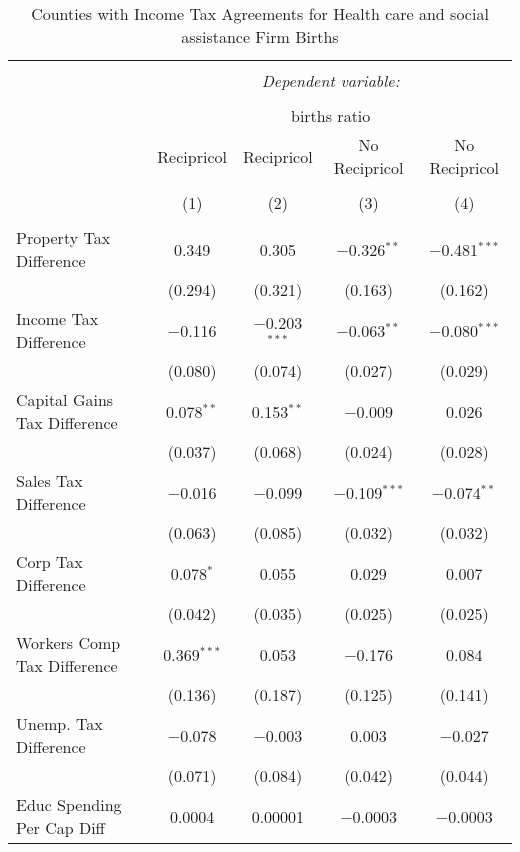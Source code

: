 
\begin{table}[!htbp] \centering 
  \caption{Counties with Income Tax Agreements for  Health care and social assistance Firm Births} 
  \label{62rd} 
\begin{tabular}{@{\extracolsep{5pt}}lcccc} 
\\[-1.8ex]\hline 
\hline \\[-1.8ex] 
 & \multicolumn{4}{c}{\textit{Dependent variable:}} \\ 
\cline{2-5} 
\\[-1.8ex] & \multicolumn{4}{c}{births ratio} \\ 
 & Recipricol & Recipricol & No Recipricol & No Recipricol \\ 
\\[-1.8ex] & (1) & (2) & (3) & (4)\\ 
\hline \\[-1.8ex] 
 Property Tax Difference & 0.349 & 0.305 & $-$0.326$^{**}$ & $-$0.481$^{***}$ \\ 
  & (0.294) & (0.321) & (0.163) & (0.162) \\ 
  Income Tax Difference & $-$0.116 & $-$0.203$^{***}$ & $-$0.063$^{**}$ & $-$0.080$^{***}$ \\ 
  & (0.080) & (0.074) & (0.027) & (0.029) \\ 
  Capital Gains Tax Difference & 0.078$^{**}$ & 0.153$^{**}$ & $-$0.009 & 0.026 \\ 
  & (0.037) & (0.068) & (0.024) & (0.028) \\ 
  Sales Tax Difference & $-$0.016 & $-$0.099 & $-$0.109$^{***}$ & $-$0.074$^{**}$ \\ 
  & (0.063) & (0.085) & (0.032) & (0.032) \\ 
  Corp Tax Difference & 0.078$^{*}$ & 0.055 & 0.029 & 0.007 \\ 
  & (0.042) & (0.035) & (0.025) & (0.025) \\ 
  Workers Comp Tax Difference & 0.369$^{***}$ & 0.053 & $-$0.176 & 0.084 \\ 
  & (0.136) & (0.187) & (0.125) & (0.141) \\ 
  Unemp. Tax Difference & $-$0.078 & $-$0.003 & 0.003 & $-$0.027 \\ 
  & (0.071) & (0.084) & (0.042) & (0.044) \\ 
  Educ Spending Per Cap Diff & 0.0004 & 0.00001 & $-$0.0003 & $-$0.0003 \\ 

\end{tabular}
\end{table}
